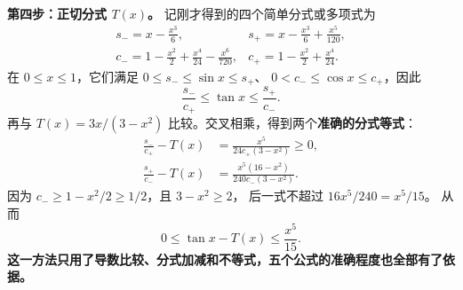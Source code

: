 \begin{proofbox}
\medskip
\textbf{第四步：正切分式 $T(x)$。}
记刚才得到的四个简单分式或多项式为
\[
\begin{array}{ll}
s_-=x-\frac{x^3}{6}, &s_+=x-\frac{x^3}{6}+\frac{x^5}{120},\\
c_-=1-\frac{x^2}{2}+\frac{x^4}{24}-\frac{x^6}{720},
&c_+=1-\frac{x^2}{2}+\frac{x^4}{24}.
\end{array}
\]
在 $0\le x\le1$，它们满足 $0\le s_-\le\sin x\le s_+$、
$0<c_-\le\cos x\le c_+$，因此
\[
\frac{s_-}{c_+}\le\tan x\le\frac{s_+}{c_-}.
\]
再与 $T(x)=3x/(3-x^2)$ 比较。交叉相乘，得到两个\textbf{准确的分式等式}：
\[
\begin{aligned}
\frac{s_-}{c_+}-T(x)
&=\frac{x^5}{24c_+(3-x^2)}\ge0,\\[3pt]
\frac{s_+}{c_-}-T(x)
&=\frac{x^5(16-x^2)}{240c_-(3-x^2)}.
\end{aligned}
\]
因为 $c_-\ge1-x^2/2\ge1/2$，且 $3-x^2\ge2$，
后一式不超过 $16x^5/240=x^5/15$。
从而
\[
\boxed{0\le\tan x-T(x)\le\frac{x^5}{15}}.
\]
\textbf{这一方法只用了导数比较、分式加减和不等式，五个公式的准确程度也全部有了依据。}

\end{proofbox}

